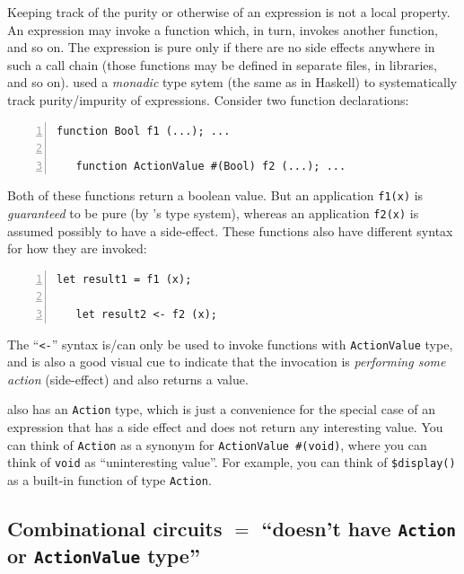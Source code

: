 Keeping track of the purity or otherwise of an expression is not a
local property.  An expression may invoke a function which, in turn,
invokes another function, and so on.  The expression is pure only if
there are no side effects anywhere in such a call chain (those
functions may be defined in separate files, in libraries, and so on).
{\BSV} used a \emph{monadic} type sytem (the same as in Haskell) to
systematically track purity/impurity of expressions.  Consider two
function declarations:


{\footnotesize
\begin{Verbatim}[frame=single, numbers=left]
   function Bool f1 (...); ...

   function ActionValue #(Bool) f2 (...); ...
\end{Verbatim}
}

Both of these functions return a boolean value.  But an application
{\tt f1(x)} is \emph{guaranteed} to be pure (by {\BSV}'s type system),
whereas an application {\tt f2(x)} is assumed possibly to have a
side-effect.  These functions also have different syntax for how they
are invoked:

{\footnotesize
\begin{Verbatim}[frame=single, numbers=left]
   let result1 = f1 (x);

   let result2 <- f2 (x);
\end{Verbatim}
}

The ``\verb|<-|'' syntax is/can only be used to invoke functions with
\verb|ActionValue| type, and is also a good visual cue to indicate
that the invocation is \emph{performing some action} (side-effect) and
also returns a value.

{\BSV} also has an \verb|Action| type, which is just a convenience for
the special case of an expression that has a side effect and does not
return any interesting value.  You can think of \verb|Action| as a
synonym for \verb|ActionValue #(void)|, where you can think of
\verb|void| as ``uninteresting value''.  For example, you can think of
\verb|$display()| as a built-in function of type \verb|Action|.


\subsection{Combinational circuits $=$ ``doesn't have {\tt Action} or {\tt ActionValue} type''}

